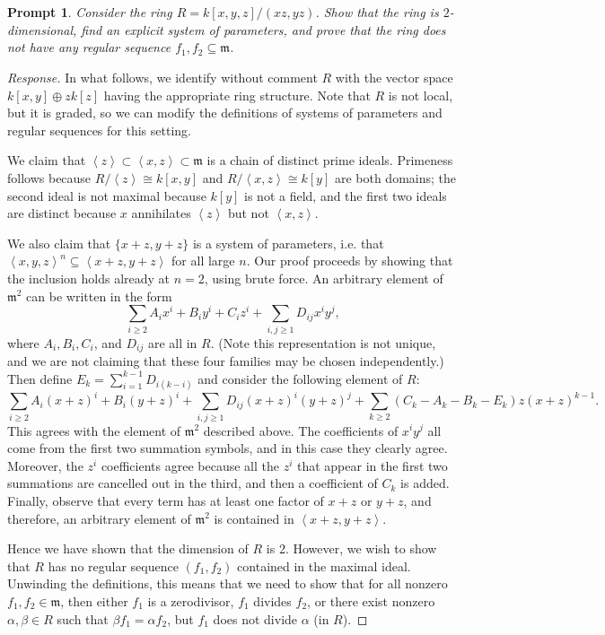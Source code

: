 \documentclass[Letter,12pt]{article}
\newcommand{\mfr}{\mathfrak{m}}
\renewcommand{\a}{\alpha}
\renewcommand{\b}{\beta}
\newcommand{\<}{\left\langle}
\renewcommand{\>}{\right\rangle}
\newcommand{\is}{\cong}
\renewcommand{\ss}{\subseteq}
\newcommand{\prob}[1]{\setcounter{section}{#1-1}\section{}}
\newtheorem*{prompt*}{Prompt}
\theoremstyle{definition}
\begin{document}
	
	\prob{10}
	\begin{prompt*}
		Consider the ring $R=k[x,y,z]/(xz,yz)$. Show that the ring is $2$-dimensional, find an explicit system of parameters, and prove that the ring does not have any regular sequence $f_1,f_2\ss\mfr$.
	\end{prompt*}
	\begin{proof}[Response]
		In what follows, we identify without comment $R$ with the vector space $k[x,y]\oplus zk[z]$ having the appropriate ring structure. Note that $R$ is not local, but it is graded, so we can modify the definitions of systems of parameters and regular sequences for this setting.
		
		We claim that $\<z\>\subset \<x,z\>\subset \mfr$ is a chain of distinct prime ideals. Primeness follows because $R/\!\<z\>\is k[x,y]$ and $R/\!\<x,z\>\is k[y]$ are both domains; the second ideal is not maximal because $k[y]$ is not a field, and the first two ideals are distinct because $x$ annihilates $\<z\>$ but not $\<x,z\>$.
		
		We also claim that $\{x+z,y+z\}$ is a system of parameters, i.e. that $\<x,y,z\>^n \subseteq \<x+z,y+z\>$ for all large $n$. Our proof proceeds by showing that the inclusion holds already at $n=2$, using brute force. An arbitrary element of $\mfr^2$ can be written in the form
		$$\sum_{i\geq 2} A_ix^i + B_iy^i+C_iz^i + \sum_{i,j\geq 1}  D_{ij}x^iy^j,$$
		where $A_i,B_i,C_i$, and $D_{ij}$ are all in $R$. (Note this representation is not unique, and we are not claiming that these four families may be chosen independently.) Then define $E_k=\sum_{i=1}^{k-1} D_{i(k-i)}$ and consider the following element of $R$:
		$$\sum_{i\geq 2} A_i(x+z)^i+B_i(y+z)^i + \sum_{i,j\geq 1} D_{ij} (x+z)^i(y+z)^j + \sum_{k\geq 2} (C_k-A_k-B_k-E_k) z(x+z)^{k-1}.$$
		This agrees with the element of $\mfr^2$ described above. The coefficients of $x^iy^j$ all come from the first two summation symbols, and in this case they clearly agree. Moreover, the $z^i$ coefficients agree because all the $z^i$ that appear in the first two summations are cancelled out in the third, and then a coefficient of $C_k$ is added. Finally, observe that every term has at least one factor of $x+z$ or $y+z$, and therefore, an arbitrary element of $\mfr^2$ is contained in $\<x+z,y+z\>$.
		
		Hence we have shown that the dimension of $R$ is 2. However, we wish to show that $R$ has no regular sequence $(f_1,f_2)$ contained in the maximal ideal. Unwinding the definitions, this means that we need to show that for all nonzero $f_1,f_2\in\mfr$, then either $f_1$ is a zerodivisor, $f_1$ divides $f_2$, or there exist nonzero $\a,\b\in R$ such that $\b f_1 = \a f_2$, but $f_1$ does not divide $\a$ (in $R$).
		

\end{proof}
\end{document}
